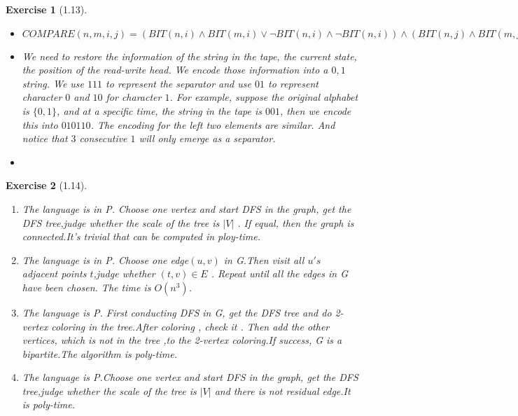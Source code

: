 \documentclass[a4paper]{article}
\newtheorem*{exercise}{Exercise}
\begin{document}
\begin{exercise}[1.13]
\begin{itemize}
		\item[(b)] $COMPARE(n,m,i,j)=(BIT(n,i)\wedge BIT(m,i)\vee \neg BIT(n,i)\wedge \neg BIT(n,i))\wedge(BIT(n,j)\wedge BIT(m,j)\vee \neg BIT(n,j)\wedge \neg BIT(n,j))$
	\item[(c)] We need to restore the information of the string in the tape, the current state, the position of the read-write head. We encode those information into a $0,1$ string. We use $111$ to represent the separator and use $01$ to represent character $0$ and $10$ for character $1$. For example, suppose the original alphabet is $\{0,1\}$, and at a specific time, the string in the tape is $001$, then we encode this into $010110$. The encoding for the left two elements are similar. And notice that $3$ consecutive $1$ will only emerge as a separator.
\item[(d)] 

	\end{itemize}
\end{exercise}

\begin{exercise}[1.14]
\begin{enumerate}		
	\item[\textbf{(a)}] 
		The language is in P.
		Choose one vertex and start DFS in the graph, get the DFS tree,judge whether the scale of the tree is $|V|$ . If equal, then the graph is connected.It's trivial that can be computed in ploy-time.
		\item[\textbf{(b)}] 
		The language is in P.
		Choose one edge$(u,v)$ in G.Then visit all $u's$ adjacent points $t$,judge whether $(t,v)\in E$ . Repeat until all the edges in G have been chosen. The time is $O(n^3)$.
		\item[\textbf{(c)}] 
		The language is P.
		First conducting DFS in G, get the DFS tree and do 2-vertex coloring in the tree.After coloring , check it .
		Then add the other vertices, which is not in the tree ,to the 2-vertex coloring.If success, G is a bipartite.The algorithm is poly-time.
		\item[\textbf{(d)}] 
		The language is P.Choose one vertex and start DFS in the graph, get the DFS tree,judge whether the scale of the tree is $|V|$ and there is not residual edge.It is poly-time.
\end{enumerate}
\end{exercise}
\end{document}
